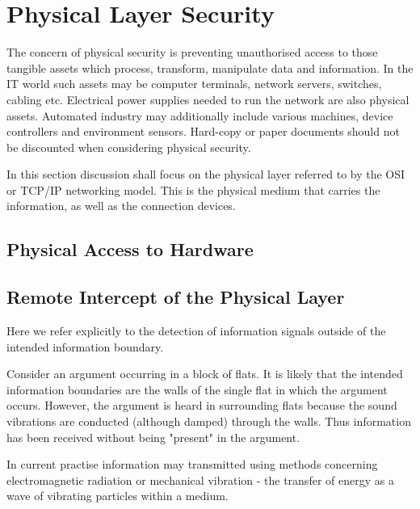 \chapter{Physical Layer Security}
The concern of physical security is preventing unauthorised access  to those tangible assets which process, transform, manipulate data and information. In the IT world such assets may be computer terminals, network servers, switches, cabling etc.
Electrical power supplies needed to run the network are also physical assets.
Automated industry may additionally include various machines, device controllers and environment sensors.
Hard-copy or paper documents should not be discounted when considering physical security.

In this section discussion shall focus on the physical layer referred to by the OSI or TCP/IP networking model. This is the physical medium that carries the information, as well as the connection devices.
\section{Physical Access to Hardware}
\section{Remote Intercept of the Physical Layer}
Here we refer explicitly to the detection of information signals outside of the intended information boundary.

Consider an argument occurring in a block of flats. It is likely that the intended information boundaries are the walls of the single flat in which the argument occurs. However, the argument is heard in surrounding flats because the sound vibrations are conducted (although damped) through the walls. Thus information has been received without being "present" in the argument.

In current practise information may transmitted using methods concerning electromagnetic radiation or mechanical vibration - the transfer of energy as a wave of vibrating particles within a medium.
